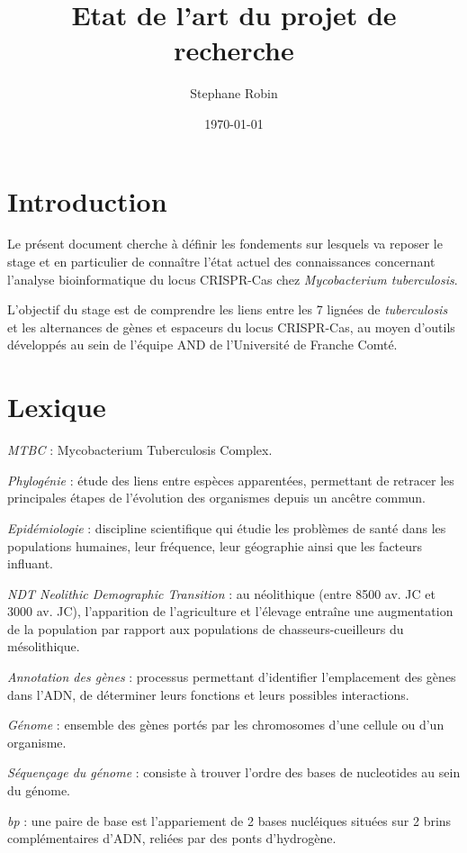 \documentclass[twoside,a4paper,12pt,frenchb,openany]{report}
\title{Etat de l'art du projet de recherche}
\author{Stephane Robin}
\date{\today}
\begin{document}
\maketitle

\section{Introduction}

Le présent document cherche à définir les fondements sur lesquels va reposer le stage et en particulier de connaître l'état actuel des connaissances concernant l'analyse bioinformatique du locus CRISPR-Cas chez \textit{Mycobacterium tuberculosis}.

L'objectif du stage est de comprendre les liens entre les 7 lignées de \textit{tuberculosis} et les alternances de gènes et espaceurs du locus CRISPR-Cas, au moyen d'outils développés au sein de l'équipe AND de l'Université de Franche Comté.

\section{Lexique}

\textit{MTBC} : Mycobacterium Tuberculosis Complex.

\textit{Phylogénie} : étude des liens entre espèces apparentées, permettant de retracer les principales étapes de l'évolution des organismes depuis un ancêtre commun.

\textit{Epidémiologie} : discipline scientifique qui étudie les problèmes de santé dans les populations humaines, leur fréquence, leur géographie ainsi que les facteurs influant.

\textit{NDT Neolithic Demographic Transition} : au néolithique (entre 8500 av. JC et 3000 av. JC), l'apparition de l'agriculture et l'élevage entraîne une augmentation de la population par rapport aux populations de chasseurs-cueilleurs du mésolithique. 

\textit{Annotation des gènes} : processus permettant d'identifier l'emplacement des gènes dans l'ADN, de déterminer leurs fonctions et leurs possibles interactions.

\textit{Génome} : ensemble des gènes portés par les chromosomes d'une cellule ou d'un organisme.

\textit{Séquençage du génome} : consiste à trouver l'ordre des bases de nucleotides au sein du génome.

\textit{bp} : une paire de base est l'appariement de 2 bases nucléiques situées sur 2 brins complémentaires d'ADN, reliées par des ponts d'hydrogène.
\end{document}
